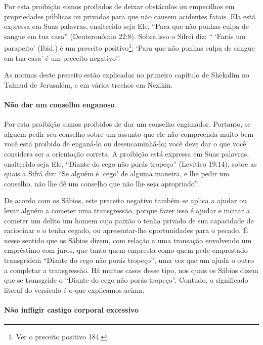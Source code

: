 Por esta proibição somos proibidos de deixar obstáculos ou empecilhos
em propriedades públicas ou privadas para que não causem acidentes
fatais. Ela está expressa em Suas palavras, enaltecido seja Ele, ``Para
que não ponhas culpa de sangue em tua casa'' (Deuteronômio 22:8). Sobre
isso o Sifrei diz: `` `Farás um parapeito' (Ibid.) é um preceito
positivo\footnote{Ver o preceito positivo 184.}; `Para que não ponhas culpa de sangue em
tua casa' é um preceito negativo''.

As normas deste preceito estão explicadas no primeiro capítulo de
Shekalim no Talmud de Jerusalém, e em vários trechos em Nezikin.

\paragraph{Não dar um conselho enganoso}

Por esta proibição somos proibidos de dar um conselho enganador.
Portanto, se alguém pedir seu conselho sobre um assunto que ele não
compreenda muito bem você está proibido de enganá-lo ou desencaminhá-lo;
você deve dar o que você considera ser a orientação correta. A proibição
está expressa em Suas palavras, enaltecido seja Ele, ``Diante do cego
não porás tropeço'' (Levítico 19:14), sobre as quais a Sifrá diz: ``Se
alguém é `cego' de alguma maneira, e lhe pedir um conselho, não lhe dê
um conselho que não lhe seja apropriado''.

De acordo com os Sábios, este preceito negativo também se aplica a
ajudar ou levar alguém a cometer uma transgressão, porque fazer isso é
ajudar e incitar a cometer um delito um homem cuja paixão o tenha
privado de sua capacidade de raciocinar e o tenha cegado, ou
apresentar-lhe oportunidades para o pecado. É nesse sentido que os
Sábios dizem, com relação a uma transação envolvendo um empréstimo com
juros, que tanto quem empresta como quem pede emprestado transgridem
``Diante do cego não porás tropeço'', uma vez que um ajuda o outro a
completar a transgressão. Há muitos casos desse tipo, nos quais os
Sábios dizem que se transgride o ``Diante do cego não porás tropeço''.
Contudo, o significado literal do versículo é o que explicamos acima.

\paragraph{Não infligir castigo corporal excessivo}

